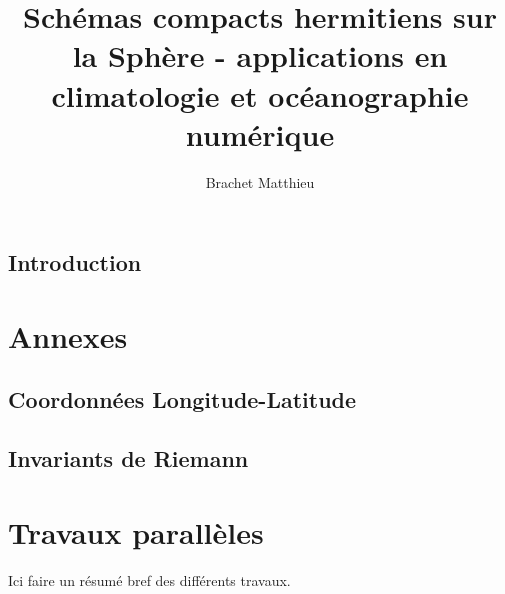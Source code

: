 \documentclass[10pt,a4paper]{book}
\author{Brachet Matthieu}
\title{Schémas compacts hermitiens sur la Sphère - applications en climatologie et océanographie numérique}
\begin{document}
\maketitle
\newpage
\tableofcontents
\listoffigures
\listoftables

\newpage
\section*{Introduction}
%









\chapter{Annexes}

\section{Coordonnées Longitude-Latitude}

\section{Invariants de Riemann}


\chapter{Travaux parallèles}
Ici faire un résumé bref des différents travaux.
\newpage




\end{document}
